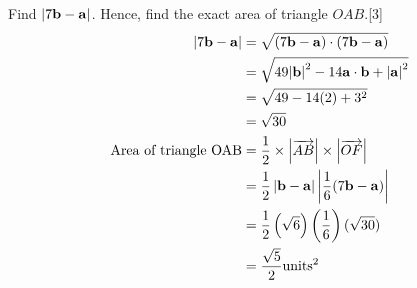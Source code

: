 \documentclass[12pt, a4 paper]{article}
\begin{document}
\begin{outline}[enumerate]
	\2 	Find $\left| {7{\bf{b}} - {\bf{a}}} \right|$. Hence, find the exact area of triangle $OAB$.\hfill[3]
	\color{blue}
	\begin{align*}
		\left| {7{\bf{b}} - {\bf{a}}} \right| & = \sqrt {(7{\bf{b}} - {\bf{a}}) \cdot (7{\bf{b}} - {\bf{a}})}                                             \\ &= \sqrt {49{{\left| {\bf{b}} \right|}^2} - 14{\bf{a}} \cdot {\bf{b}} + {{\left| {\bf{a}} \right|}^2}} \\ &= \sqrt {49 - 14(2) + {3^2}} \\ &= \sqrt {30}\\
		{\textrm{Area of triangle OAB}}       & = \frac{1}{2} \times \left| {\overrightarrow {AB} } \right| \times \left| {\overrightarrow {OF} } \right| \\ &= \frac{1}{2}\left| {{\bf{b}} - {\bf{a}}} \right|\left| {\frac{1}{6}(7{\bf{b}} - {\bf{a}})} \right|\\ &= \frac{1}{2}\left( {\sqrt 6 } \right)\left( {\frac{1}{6}} \right)(\sqrt {30} )\\ &= \frac{{\sqrt 5 }}{2}{\textrm{unit}}{{\textrm{s}}^2}
	\end{align*}
							        

\end{outline}
\end{document}
